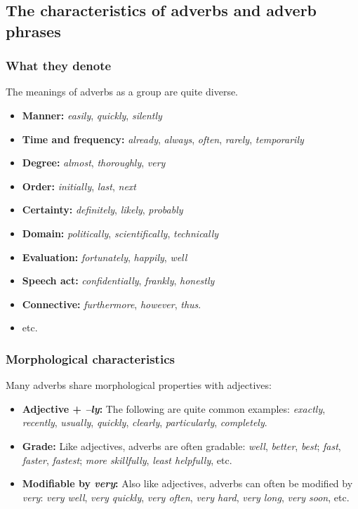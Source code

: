 \subsection{The characteristics of adverbs and adverb phrases}

\subsubsection*{What they denote}

The meanings of adverbs as a group are quite diverse.

\begin{itemize}
   \item \textbf{Manner:} \textit{easily}, \textit{quickly}, \textit{silently}
   \item \textbf{Time and frequency:} \textit{already}, \textit{always}, \textit{often}, \textit{rarely}, \textit{temporarily}
   \item \textbf{Degree:} \textit{almost}, \textit{thoroughly}, \textit{very}
   \item \textbf{Order:} \textit{initially}, \textit{last}, \textit{next}
   \item \textbf{Certainty:} \textit{definitely}, \textit{likely}, \textit{probably}
   \item \textbf{Domain:} \textit{politically}, \textit{scientifically}, \textit{technically}
   \item \textbf{Evaluation:} \textit{fortunately}, \textit{happily}, \textit{well}
   \item \textbf{Speech act:} \textit{confidentially}, \textit{frankly}, \textit{honestly}
   \item \textbf{Connective:} \textit{furthermore}, \textit{however}, \textit{thus}.
   \item etc.
\end{itemize}

\subsubsection*{Morphological characteristics}
Many adverbs share morphological properties with adjectives:
\begin{itemize}
   \item \textbf{Adjective + \textit{--ly}:} The following are quite common examples: \textit{exactly}, \textit{recently}, \textit{usually}, \textit{quickly}, \textit{clearly}, \textit{particularly}, \textit{completely}.
   \item \textbf{Grade:} Like adjectives, adverbs are often gradable: \textit{well}, \textit{better}, \textit{best}; \textit{fast}, \textit{faster}, \textit{fastest}; \textit{more skillfully}, \textit{least helpfully}, etc.
   \item \textbf{Modifiable by \textit{very}:} Also like adjectives, adverbs can often be modified by \textit{very}: \textit{very well}, \textit{very quickly}, \textit{very often}, \textit{very hard}, \textit{very long}, \textit{very soon}, etc.
\end{itemize}

